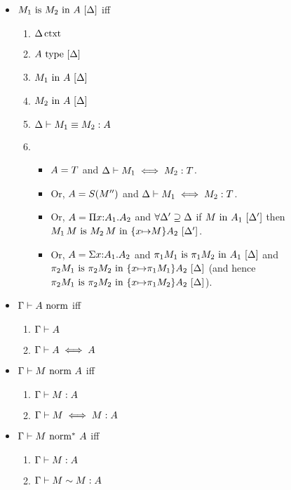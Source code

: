 \documentclass{article}
\theoremstyle{break}
\begin{document}
\begin{itemize}
\item $\semanticequivterm{\world}{\constructor_1}{\constructor_2}{\kind}$ iff
\begin{enumerate}
\item $\semanticcontext{\world}$
\item $\semanticvalidtype{\world}{\kind}$
\item $\semanticvalidterm{\world}{\constructor_1}{\kind}$
\item $\semanticvalidterm{\world}{\constructor_2}{\kind}$
\item $\equivconstructor{\world}{\constructor_1}{\constructor_2}{\kind}$
\item
\begin{itemize}{}
\item $\kind = \ktype$ and 
$\aconequiv{\world}{\constructor_1}{\constructor_2}{\ktype}$.
\item Or, $\kind = \ksingleton{\constructor''}$ and 
$\aconequiv{\world}{\constructor_1}{\constructor_2}{\ktype}$.
\item Or, $\kind = \kpi{\cvar}{\kind_1}{\kind_2}$ and
$\forall \world'\supseteq\world$ if $\semanticvalidterm{\world'}{\constructor}{\kind_1}$
then $\semanticequivterm{\world'}{\capply{\constructor_1}{\constructor}}{\capply{\constructor_2}{\constructor}}{\substitute{\cvar}{\constructor}{\kind_2}}$.
\item Or, $\kind = \ksigma{\cvar}{\kind_1}{\kind_2}$ and
$\semanticequivterm{\world}{\cpi{1}{\constructor_1}}{\cpi{1}{\constructor_2}}{\kind_1}$ and
$\semanticequivterm{\world}{\cpi{2}{\constructor_1}}{\cpi{2}{\constructor_2}}{\substitute{\cvar}{\cpi{1}{\constructor_1}}{\kind_2}}$
(and hence 
$\semanticequivterm{\world}{\cpi{2}{\constructor_1}}{\cpi{2}{\constructor_2}}{\substitute{\cvar}{\cpi{1}{\constructor_2}}{\kind_2}}$).
\end{itemize}
\end{enumerate}

\item $\normtype{\context}{\kind}$ iff
\begin{enumerate}{}
\item $\validkind{\context}{\kind}$
\item $\akindequiv{\context}{\kind}{\kind}$
\end{enumerate}

\item $\normterm{\context}{\constructor}{\kind}$ iff
\begin{enumerate}
\item $\validconstructor{\context}{\constructor}{\kind}$
\item $\aconequiv{\context}{\constructor}{\constructor}{\kind}$
\end{enumerate}

\item $\normE{\context}{\constructor}{\kind}$ iff
\begin{enumerate}
\item $\validconstructor{\context}{\constructor}{\kind}$
\item $\weakconequiv{\context}{\constructor}{\constructor}{\kind}$
\end{enumerate}

\end{itemize}
\end{document}
